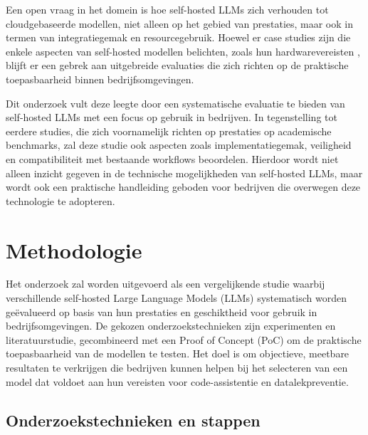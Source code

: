 Een open vraag in het domein is hoe self-hosted LLMs zich verhouden tot cloudgebaseerde modellen, niet alleen op het gebied van prestaties, maar ook in termen van integratiegemak en resourcegebruik. Hoewel er case studies zijn die enkele aspecten van self-hosted modellen belichten, zoals hun hardwarevereisten \autocite{Rao2023}, blijft er een gebrek aan uitgebreide evaluaties die zich richten op de praktische toepasbaarheid binnen bedrijfsomgevingen.

Dit onderzoek vult deze leegte door een systematische evaluatie te bieden van self-hosted LLMs met een focus op gebruik in bedrijven. In tegenstelling tot eerdere studies, die zich voornamelijk richten op prestaties op academische benchmarks, zal deze studie ook aspecten zoals implementatiegemak, veiligheid en compatibiliteit met bestaande workflows beoordelen. Hierdoor wordt niet alleen inzicht gegeven in de technische mogelijkheden van self-hosted LLMs, maar wordt ook een praktische handleiding geboden voor bedrijven die overwegen deze technologie te adopteren.

\section{Methodologie}%
\label{sec:methodologie}

Het onderzoek zal worden uitgevoerd als een vergelijkende studie waarbij verschillende self-hosted Large Language Models (LLMs) systematisch worden geëvalueerd op basis van hun prestaties en geschiktheid voor gebruik in bedrijfsomgevingen. De gekozen onderzoekstechnieken zijn experimenten en literatuurstudie, gecombineerd met een Proof of Concept (PoC) om de praktische toepasbaarheid van de modellen te testen. Het doel is om objectieve, meetbare resultaten te verkrijgen die bedrijven kunnen helpen bij het selecteren van een model dat voldoet aan hun vereisten voor code-assistentie en datalekpreventie.

\subsection{Onderzoekstechnieken en stappen}

